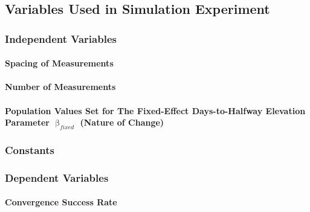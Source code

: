 \documentclass[
12pt, %
twoside,
english]{guelphthesis}
\begin{document}
\hypertarget{variables-used-in-simulation-experiment}{%
\subsection{Variables Used in Simulation Experiment}\label{variables-used-in-simulation-experiment}}

\hypertarget{independent-variables}{%
\subsubsection{Independent Variables}\label{independent-variables}}

\hypertarget{spacing-measurements}{%
\paragraph{Spacing of Measurements}\label{spacing-measurements}}

\hypertarget{number-measurements}{%
\paragraph{Number of Measurements}\label{number-measurements}}

\hypertarget{population-values-set-for-the-fixed-effect-days-to-halfway-elevation-parameter-upbeta_fixed-nature-of-change}{%
\paragraph{\texorpdfstring{Population Values Set for The Fixed-Effect Days-to-Halfway Elevation Parameter \(\upbeta_{fixed}\) (Nature of Change)}{Population Values Set for The Fixed-Effect Days-to-Halfway Elevation Parameter \textbackslash upbeta\_\{fixed\} (Nature of Change)}}\label{population-values-set-for-the-fixed-effect-days-to-halfway-elevation-parameter-upbeta_fixed-nature-of-change}}

\hypertarget{constants}{%
\subsubsection{Constants}\label{constants}}

\hypertarget{dependent-variables}{%
\subsubsection{Dependent Variables}\label{dependent-variables}}

\hypertarget{convergence}{%
\paragraph{Convergence Success Rate}\label{convergence}}
\end{document}
